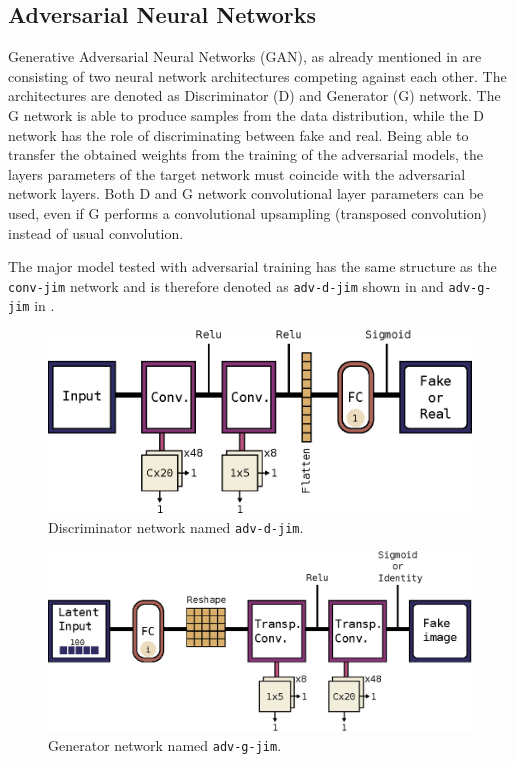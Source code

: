 
\subsection{Adversarial Neural Networks}\label{sec:nn_arch_adv}
Generative Adversarial Neural Networks (GAN), as already mentioned in  are consisting of two neural network architectures competing against each other.
The architectures are denoted as Discriminator (D) and Generator (G) network.
The G network is able to produce samples from the data distribution, while the D network has the role of discriminating between fake and real.
Being able to transfer the obtained weights from the training of the adversarial models, the layers parameters of the target network must coincide with the adversarial network layers.
Both D and G network convolutional layer parameters can be used, even if G performs a convolutional upsampling (transposed convolution) instead of usual convolution.

The major model tested with adversarial training has the same structure as the \texttt{conv-jim} network and is therefore denoted as \texttt{adv-d-jim} shown in  and \texttt{adv-g-jim} in .

\begin{figure}[!ht]
  \centering
    \includegraphics[height=0.2\textwidth]{./4_nn/figs/nn_arch_adv_d_jim.eps}
  \caption{Discriminator network named \texttt{adv-d-jim}.}
  \label{fig:nn_arch_adv_d_jim}
\end{figure}
\FloatBarrier
\noindent

\begin{figure}[!ht]
  \centering
    \includegraphics[height=0.23\textwidth]{./4_nn/figs/nn_arch_adv_g_jim.eps}
  \caption{Generator network named \texttt{adv-g-jim}.}
  \label{fig:nn_arch_adv_g_jim}
\end{figure}
\FloatBarrier
\noindent

